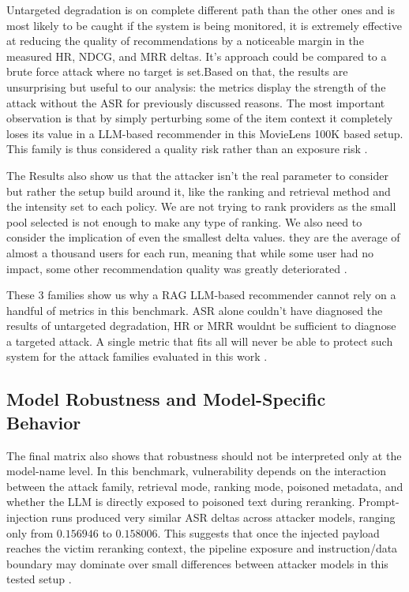 Untargeted degradation is on complete different path than the other ones and is most likely to be caught if the system is being monitored, it is extremely effective at reducing the quality of recommendations by a noticeable margin in the measured HR, NDCG, and MRR deltas. It's approach could be compared to a brute force attack where no target is set.Based on that, the results are unsurprising but useful to our analysis: the metrics display the strength of the attack without the ASR for previously discussed reasons. The most important observation is that by simply perturbing some of the item context it completely loses its value in a LLM-based recommender in this MovieLens 100K based setup. This family is thus considered a quality risk rather than an exposure risk \cite{ragpoisonlab_repo,zhong2023retrievalcorpora,nazary2025poisonrag}.

The Results also show us that the attacker isn't the real parameter to consider but rather the setup build around it, like the ranking and retrieval method and the intensity set to each policy. We are not trying to rank providers as the small pool selected is not enough to make any type of ranking. We also need to consider the implication of even the smallest delta values. they are the average of almost a thousand users for each run, meaning that while some user had no impact, some other recommendation quality was greatly deteriorated \cite{ragpoisonlab_repo}.

These 3 families show us why a RAG LLM-based recommender cannot rely on a handful of metrics in this benchmark. ASR alone couldn't have diagnosed the results of untargeted degradation, HR or MRR wouldnt be sufficient to diagnose a targeted attack. A single metric that fits all will never be able to protect such system for the attack families evaluated in this work \cite{herlocker2004evaluating,wang2013ndcg,liang2023helm,ru2024ragchecker}.


\subsection{Model Robustness and Model-Specific Behavior}

The final matrix also shows that robustness should not be interpreted only at the model-name level. In this benchmark, vulnerability depends on the interaction between the attack family, retrieval mode, ranking mode, poisoned metadata, and whether the LLM is directly exposed to poisoned text during reranking. Prompt-injection runs produced very similar ASR deltas across attacker models, ranging only from \(0.156946\) to \(0.158006\). This suggests that once the injected payload reaches the victim reranking context, the pipeline exposure and instruction/data boundary may dominate over small differences between attacker models in this tested setup \cite{ragpoisonlab_repo,greshake2023indirectpi,yi2025bipia}.

